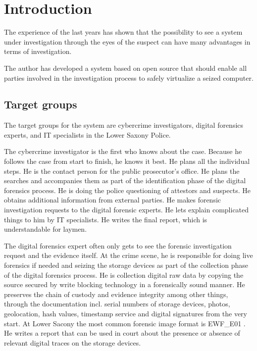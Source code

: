 \chapter{Introduction}

The experience of the last years has shown that the possibility to see a system under investigation through the eyes of the suspect can have many advantages in terms of investigation.

The author has developed a system based on open source that should enable all parties involved in the investigation process to safely virtualize a seized computer.

\section{Target groups}

The target groups for the system are cybercrime investigators, digital forensics experts, and IT specialists in the Lower Saxony Police.

The cybercrime investigator is the first who knows about the case. Because he follows the case from start to finish, he knows it best. He plans all the individual steps. He is the contact person for the public prosecutor's office. He plans the searches and accompanies them as part of the identification phase of the digital forensics process. \cite{Aarnes2017:16} %
He is doing the police questioning of attestors and suspects. He obtains additional information from external parties. He makes forensic investigation requests to the digital forensic experts. He lets explain complicated things to him by IT specialists. He writes the final report, which is understandable for laymen.

The digital forensics expert often only gets to see the forensic investigation request and the evidence itself. At the crime scene, he is responsible for doing live forensics if needed and seizing the storage devices as part of the collection phase of the digital forensics process. He is collection digital raw data by copying the source secured by write blocking technology in a forensically sound manner. \cite{Aarnes2017:16} %
He preserves the chain of custody and evidence integrity among other things, through the documentation incl. serial numbers of storage devices, photos, geolocation, hash values, timestamp service and digital signatures from the very start. \cite{Aarnes2017:23} %
At Lower Sacony the most common forensic image format is EWF\_E01 \cite{EWF}.
He writes a report that can be used in court about the presence or absence of relevant digital traces on the storage devices.

